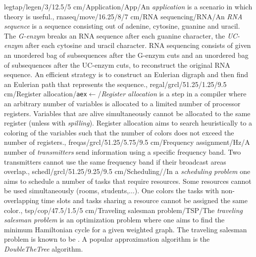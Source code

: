 legtap/legen/3/12.5/5 cm/Application/App/{An \emph{application} is a scenario in which theory is useful.},
rnaseq/move/16.25/8/7 cm/{RNA sequencing}/{RNA}/{An \emph{RNA sequence} is a sequence consisting out of adenine, cytosine, guanine and uracil. The \emph{G-enzym} breaks an RNA sequence after each guanine character, the \emph{UC-enzym} after each cytosine and uracil character. RNA sequencing consists of given an unordered bag of subsequences after the G-enzym cuts and an unordered bag of subsequences after the UC-enzym cuts, to reconstruct the original RNA sequence. An efficient strategy is to construct an Eulerian digraph and then find an Eulerian path that represents the sequence.},
regal/grcl/51.25/1.25/9.5 cm/{Register allocation}/{\texttt{aex}$\gets$}/{\emph{Register allocation} is a step in a compiler where an arbitrary number of variables is allocated to a limited number of processor registers. Variables that are alive simultaneously cannot be allocated to the same register (unless with \emph{spilling}). Register allocation aims to search heuristically to a coloring of the variables such that the number of colors does not exceed the number of registers.},
freqas/grcl/51.25/5.75/9.5 cm/{Frequency assignment}/{Hz}/{A number of \emph{transmitters} send information using a specific frequency band. Two transmitters cannot use the same frequency band if their broadcast areas overlap.},
schedl/grcl/51.25/9.25/9.5 cm/{Scheduling}/{\clock}/{In a \emph{scheduling problem} one aims to schedule a number of tasks that require resources. Some resources cannot be used simultaneously (rooms, students,...). One colors the tasks with non-overlapping time slots and tasks sharing a resource cannot be assigned the same color.},
tsp/cop/47.5/1.5/5 cm/{Traveling salesman problem}/{TSP}/{The \emph{traveling salesman problem} is an optimization problem where one aims to find the minimum Hamiltonian cycle for a given weighted graph. The traveling salesman problem is known to be \ccnph{}. A popular approximation algorithm is the \emph{DoubleTheTree} algorithm.}